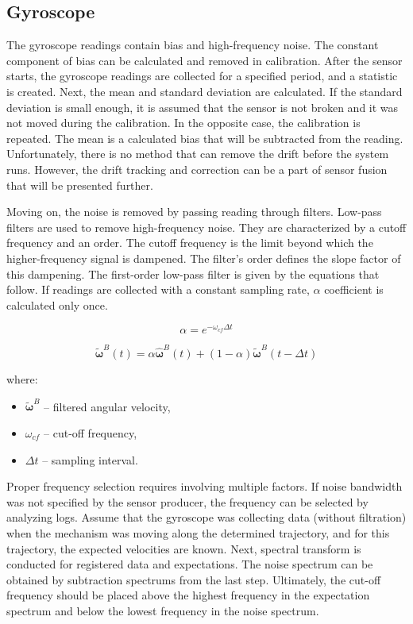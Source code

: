 \subsection{Gyroscope}

The gyroscope readings contain bias and high-frequency noise. The constant component of bias can be calculated and removed in calibration. After the sensor starts, the gyroscope readings are collected for a specified period, and a statistic is created. Next, the mean and standard deviation are calculated. If the standard deviation is small enough, it is assumed that the sensor is not broken and it was not moved during the calibration. In the opposite case, the calibration is repeated. The mean is a calculated bias that will be subtracted from the reading. Unfortunately, there is no method that can remove the drift before the system runs. However, the drift tracking and correction can be a part of sensor fusion that will be presented further.


Moving on, the noise is removed by passing reading through filters. Low-pass filters are used to remove high-frequency noise. They are characterized by a cutoff frequency and an order. The cutoff frequency is the limit beyond which the higher-frequency signal is dampened. The filter’s order defines the slope factor of this dampening. The first-order low-pass filter is given by the equations that follow. If readings are collected with a constant sampling rate, $\alpha$ coefficient is calculated only once.

\begin{equation}
	 \alpha = e^{ - \omega_{cf} \varDelta t}
	\label{lpf_alpha}
\end{equation}

\begin{equation}
	\bm{\tilde{\omega}}^B(t) = \alpha  \bm{\hat{\omega}}^B(t) + \left( 1 - \alpha \right) \bm{\tilde{\omega}}^B(t - \varDelta t)
	\label{lpf}
\end{equation}

where:
\begin{itemize}
	\item $\bm{\tilde{\omega}}^B$ -- filtered angular velocity,
	\item $\omega_{cf}$ -- cut-off frequency,
	\item $\varDelta t$ -- sampling interval.
\end{itemize}

Proper frequency selection requires involving multiple factors. If noise bandwidth was not specified by the sensor producer, the frequency can be selected by analyzing logs. Assume that the gyroscope was collecting data (without filtration) when the mechanism was moving along the determined trajectory, and for this trajectory, the expected velocities are known. Next, spectral transform is conducted for registered data and expectations. The noise spectrum can be obtained by subtraction spectrums from the last step. Ultimately, the cut-off frequency should be placed above the highest frequency in the expectation spectrum and below the lowest frequency in the noise spectrum.\\

